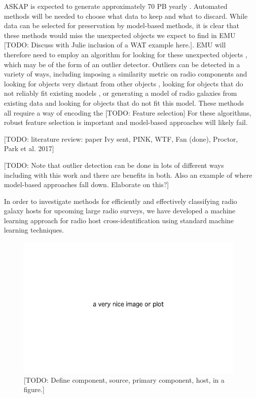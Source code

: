\documentclass[fleqn,usenatbib,usedcolumn]{mnras}
\begin{document}
  ASKAP is expected to generate approximately 70 PB yearly
  \citep{norris17unexpected}. Automated methods will be needed to choose what
  data to keep and what to discard. While data can be selected for
  preservation by model-based methods, it is clear that these methods would
  miss the unexpected objects we expect to find in EMU [TODO: Discuss with
  Julie inclusion of a WAT example here.]. EMU will therefore need to employ
  an algorithm for looking for these unexpected objects
  \citep{norris17unexpected}, which may be of the form of an outlier detector.
  Outliers can be detected in a variety of ways, including imposing a
  similarity metric on radio components and looking for objects very distant
  from other objects \citep{polsterer15pink}, looking for objects that do not
  reliably fit existing models \citep[potentially an extension of][]{fan15}, or
  generating a model of radio galaxies from existing data and looking for
  objects that do not fit this model. These methods all require a way of
  encoding the [TODO: Feature selection] For these algorithms, robust feature
  selection is important and model-based approaches \citep[e.g.][]{proctor06}
  will likely fail.

  {[}TODO: literature review: paper Ivy sent, PINK, WTF, Fan (done),
  Proctor, Park et al. 2017{]}

  {[}TODO: Note that outlier detection can be done in lots of different
  ways including with this work and there are benefits in both. Also an
  example of where model-based approaches fall down. Elaborate on this?{]}

  In order to investigate methods for efficiently and effectively
  classifying radio galaxy hosts for upcoming large radio surveys, we have
  developed a machine learning approach for radio host
  cross-identification using standard machine learning techniques.

  \begin{figure}
    \includegraphics[width=\linewidth]{images/placeholder.png}
    \caption{[TODO: Define component, source, primary component, host, in a figure.]}
  \end{figure}
\end{document}
